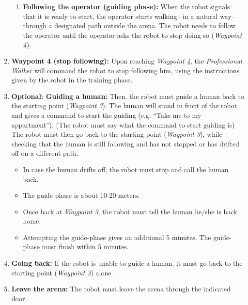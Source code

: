 \begin{enumerate}
\begin{enumerate}
	\item \textbf{Following the operator (guiding phase):} 
	When the robot signals that it is ready to start, the operator starts walking --in a natural way-- through a designated path outside the arena. 
	The robot needs to follow the operator until the operator asks the robot to stop doing so (\textit{Waypoint 4}).
	\end{enumerate}

	\item \textbf{Waypoint 4 (stop following):} Upon reaching \textit{Waypoint 4}, 
	  the \textit{Professional Walker} will command the robot to stop following him, using the instructions given by the robot in the training phase.
	
	\item \textbf{Optional: Guiding a human:} Then, the robot must guide a human back to the starting point (\textit{Waypoint 3}).
	The human will stand in front of the robot and gives a command to start the guiding (e.g. ``Take me to my appartment'').
	(The robot must say what the command to start guiding is)
	The robot must then go back to the starting point (\textit{Waypoint 3}), while checking that the human is still following and has not stopped or has drifted off on a different path.
	
	\begin{itemize}
	 \item In case the human drifts off, the robot must stop and call the human back. 
	 \item The guide phase is about 10-20 meters.
	 \item Once back at \textit{Waypoint 3}, the robot must tell the human he/she is back home. 
	 \item Attempting the guide-phase gives an additional 5 minutes. 
	  The guide-phase must finish within 5 minutes. 
	\end{itemize}
	
	\item \textbf{Going back:} If the robot is unable to guide a human, it must go back to the starting point (\textit{Waypoint 3}) alone. 
	
	\item \textbf{Leave the arena:} The robot must leave the arena through the indicated door.
\end{enumerate}

